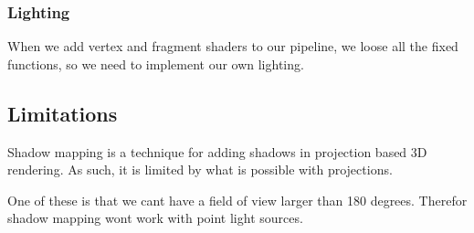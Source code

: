 \subsubsection{Lighting}

When we add vertex and fragment shaders to our pipeline, we loose all
the fixed functions, so we need to implement our own lighting.

\subsection{Limitations}



Shadow mapping is a technique for adding shadows in projection based 
3D rendering. As such, it is limited by what is possible with projections.

One of these is that we cant have a field of view larger than 180
degrees. Therefor shadow mapping wont work with point
light sources.

